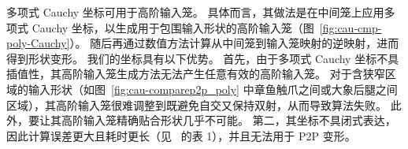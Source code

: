 多项式 Cauchy 坐标可用于高阶输入笼。
具体而言，其做法是在中间笼上应用多项式 Cauchy 坐标，以生成用于包围输入形状的高阶输入笼（图~\ref{fig:cau-cmp-poly-Cauchy}）。
随后再通过数值方法计算从中间笼到输入笼映射的逆映射，进而得到形状变形。
%
我们的坐标具有以下优势。
首先，由于多项式 Cauchy 坐标不具插值性，其高阶输入笼生成方法无法产生任意有效的高阶输入笼。
对于含狭窄区域的输入形状（如图~\ref{fig:cau-comparep2p_poly} 中章鱼触爪之间或大象后腿之间区域），其高阶输入笼很难调整到既避免自交又保持双射，从而导致算法失败。
此外，要让其高阶输入笼精确贴合形状几乎不可能。
%
第二，其坐标不具闭式表达，因此计算误差更大且耗时更长（见~\cite{Lin2024PolynomialCC} 的表 1），并且无法用于 P2P 变形。

